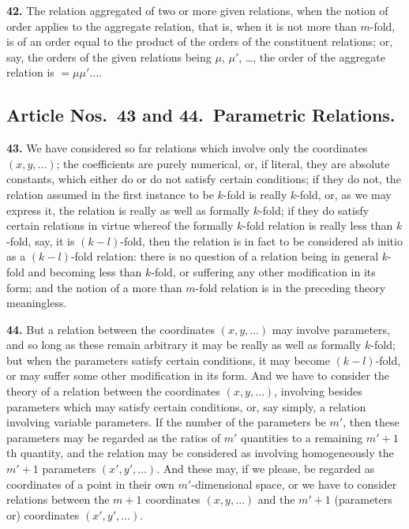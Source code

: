\documentclass[11pt,a4paper]{article}
\theoremstyle{definition}
\begin{document}
\noindent\textbf{42.} The relation aggregated of two or more given relations, when the notion of order applies to the aggregate relation, that is, when it is not more than $m$-fold, is of an order equal to the product of the orders of the constituent relations; or, say, the orders of the given relations being $\mu$, $\mu'$, \ldots, the order of the aggregate relation is $=\mu\mu'\ldots$.

\subsection*{Article Nos.\ 43 and 44.\ Parametric Relations.}

\setcounter{page}{462}

\noindent\textbf{43.} We have considered so far relations which involve only the coordinates $(x,y,\ldots)$; the coefficients are purely numerical, or, if literal, they are absolute constants, which either do or do not satisfy certain conditions; if they do not, the relation assumed in the first instance to be $k$-fold is really $k$-fold, or, as we may express it, the relation is really as well as formally $k$-fold; if they do satisfy certain relations in virtue whereof the formally $k$-fold relation is really less than $k$-fold, say, it is $(k-l)$-fold, then the relation is in fact to be considered ab initio as a $(k-l)$-fold relation: there is no question of a relation being in general $k$-fold and becoming less than $k$-fold, or suffering any other modification in its form; and the notion of a more than $m$-fold relation is in the preceding theory meaningless.

\noindent\textbf{44.} But a relation between the coordinates $(x,y,\ldots)$ may involve parameters, and so long as these remain arbitrary it may be really as well as formally $k$-fold; but when the parameters satisfy certain conditions, it may become $(k-l)$-fold, or may suffer some other modification in its form. And we have to consider the theory of a relation between the coordinates $(x,y,\ldots)$, involving besides parameters which may satisfy certain conditions, or, say simply, a relation involving variable parameters. If the number of the parameters be $m'$, then these parameters may be regarded as the ratios of $m'$ quantities to a remaining $m'+1$th quantity, and the relation may be considered as involving homogeneously the $m'+1$ parameters $(x',y',\ldots)$. And these may, if we please, be regarded as coordinates of a point in their own $m'$-dimensional space, or we have to consider relations between the $m+1$ coordinates $(x,y,\ldots)$ and the $m'+1$ (parameters or) coordinates $(x',y',\ldots)$.
\end{document}
